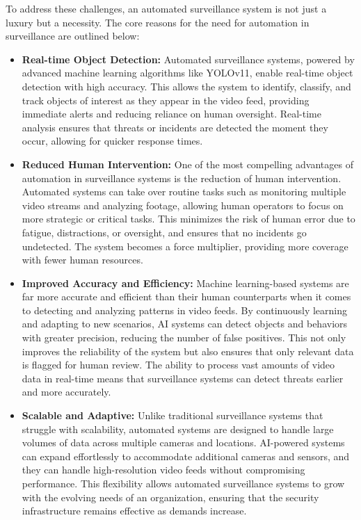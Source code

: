 \documentclass[12pt]{report}
\begin{document}
To address these challenges, an automated surveillance system is not just a luxury but a necessity. The core reasons for the need for automation in surveillance are outlined below:

\begin{itemize}
    \item \textbf{Real-time Object Detection:} 
    Automated surveillance systems, powered by advanced machine learning algorithms like YOLOv11, enable real-time object detection with high accuracy. This allows the system to identify, classify, and track objects of interest as they appear in the video feed, providing immediate alerts and reducing reliance on human oversight. Real-time analysis ensures that threats or incidents are detected the moment they occur, allowing for quicker response times.
    
    \item \textbf{Reduced Human Intervention:} 
    One of the most compelling advantages of automation in surveillance systems is the reduction of human intervention. Automated systems can take over routine tasks such as monitoring multiple video streams and analyzing footage, allowing human operators to focus on more strategic or critical tasks. This minimizes the risk of human error due to fatigue, distractions, or oversight, and ensures that no incidents go undetected. The system becomes a force multiplier, providing more coverage with fewer human resources.
    
    \item \textbf{Improved Accuracy and Efficiency:} 
    Machine learning-based systems are far more accurate and efficient than their human counterparts when it comes to detecting and analyzing patterns in video feeds. By continuously learning and adapting to new scenarios, AI systems can detect objects and behaviors with greater precision, reducing the number of false positives. This not only improves the reliability of the system but also ensures that only relevant data is flagged for human review. The ability to process vast amounts of video data in real-time means that surveillance systems can detect threats earlier and more accurately.
    
    \item \textbf{Scalable and Adaptive:} 
    Unlike traditional surveillance systems that struggle with scalability, automated systems are designed to handle large volumes of data across multiple cameras and locations. AI-powered systems can expand effortlessly to accommodate additional cameras and sensors, and they can handle high-resolution video feeds without compromising performance. This flexibility allows automated surveillance systems to grow with the evolving needs of an organization, ensuring that the security infrastructure remains effective as demands increase.
    

\end{itemize}
\end{document}
